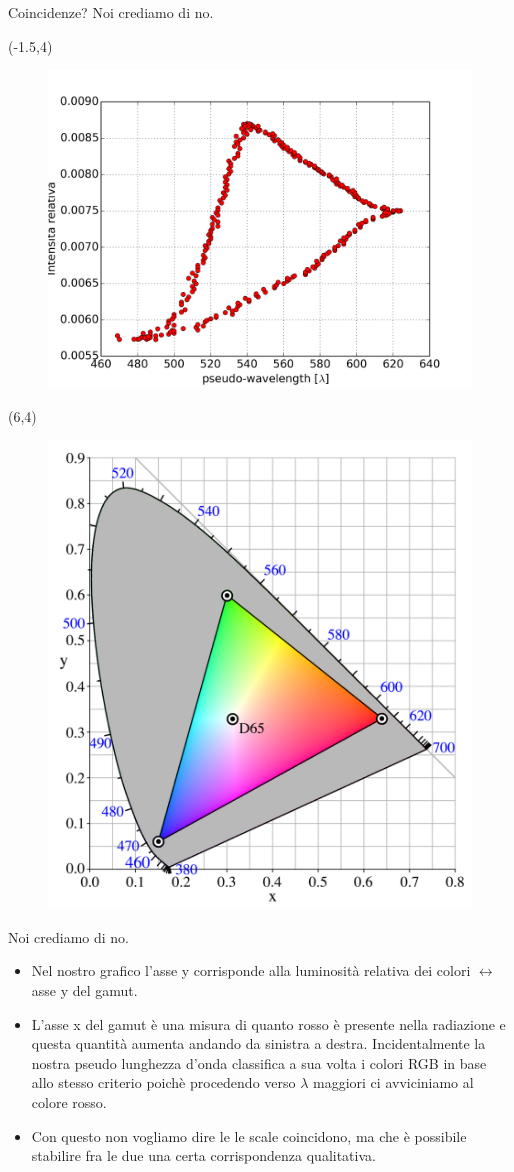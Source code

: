 \documentclass{beamer}
\begin{document}
\begin{frame}{Coincidenze? Noi crediamo di no.}

\begin{textblock}{12}(-1.5,4)
\begin{figure}
\centering
\includegraphics[width=0.7\linewidth]{./nostro_gamut}
\label{fig:nostro_gamu}
\end{figure}
\end{textblock}


\begin{textblock}{12}(6,4)
\begin{figure}
\includegraphics[width=0.45\linewidth]{./8_CIExy1931_sRGB_gamut_D65}
\end{figure}
\end{textblock}



Noi crediamo di no.

\end{frame}

\begin{frame}
\begin{itemize}
\item Nel nostro grafico l'asse y corrisponde alla luminosità relativa dei colori $\leftrightarrow$ asse y del gamut.
\item L'asse x del gamut è una misura di quanto rosso è presente nella radiazione e questa quantità aumenta andando da sinistra a destra. Incidentalmente la nostra pseudo lunghezza d'onda classifica a sua volta i colori RGB in base allo stesso criterio poichè procedendo verso $\lambda$ maggiori ci avviciniamo al colore rosso.
\item Con questo non vogliamo dire le le scale coincidono, ma che è possibile stabilire fra le due una certa corrispondenza qualitativa.
\end{itemize}
\end{frame}
\end{document}
